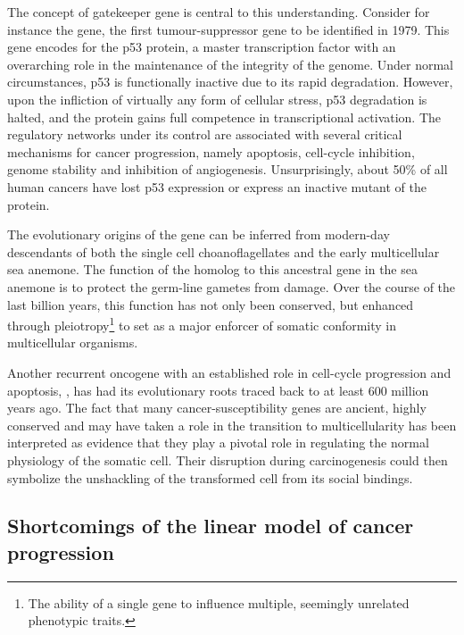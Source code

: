 The concept of gatekeeper gene is central to this understanding.  Consider for
instance the  gene, the first \mbox{tumour-suppressor}
gene to be identified in 1979.  This gene encodes for the p53 protein, a master
transcription factor with an overarching role in the maintenance of the
integrity of the genome.\cite{efeyan_p53:_2007} Under normal circumstances, p53
is functionally inactive due to its rapid degradation.  However, upon the
infliction of virtually any form of cellular stress, p53 degradation is halted,
and the protein gains full competence in transcriptional activation.  The
regulatory networks under its control are associated with several critical
mechanisms for cancer progression, namely apoptosis, \mbox{cell-cycle}
inhibition, genome stability and inhibition of
angiogenesis.\cite{vogelstein_surfing_2000} Unsurprisingly, about 50\% of all
human cancers have lost p53 expression or express an inactive mutant of the
protein.\cite{toledo_regulating_2006}

The evolutionary origins of the  gene can be inferred
from modern-day descendants of both the single cell choanoflagellates and the
early multicellular sea anemone.  The function of the homolog to this ancestral
gene in the sea anemone is to protect the germ-line gametes from 
damage.\cite{belyi_origins_2010} Over the course of the last billion years, this
function has not only been conserved, but enhanced through
pleiotropy\footnote{The ability of a single gene to influence multiple,
  seemingly unrelated phenotypic traits.} to set  as a
major enforcer of somatic conformity in multicellular organisms.

Another recurrent oncogene with an established role in \mbox{cell-cycle}
progression and apoptosis, , has had its evolutionary
roots traced back to at least 600 million years ago.\cite{hartl_stem_2010} The
fact that many cancer-susceptibility genes are ancient, highly conserved and may
have taken a role in the transition to
multicellularity\cite{srivastava_amphimedon_2010} has been interpreted as
evidence that they play a pivotal role in regulating the normal physiology of
the somatic cell.\cite{weinberg_oncogenes_1983,weinberg_biology_2013} Their
disruption during carcinogenesis could then symbolize the unshackling of the
transformed cell from its social bindings.

\subsection{Shortcomings of the linear model of cancer progression}
\label{sec:shortcomings-canonical-model}


